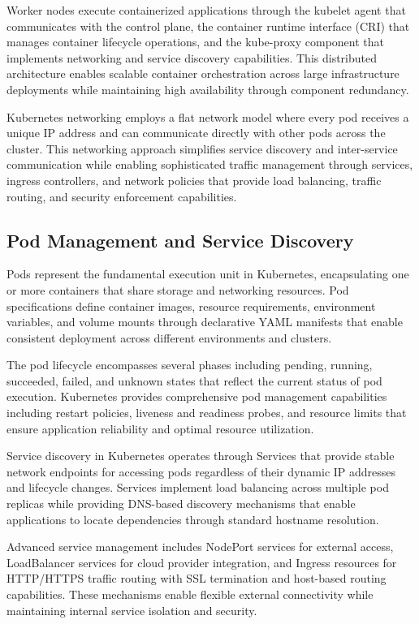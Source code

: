Worker nodes execute containerized applications through the kubelet agent that communicates with the control plane, the container runtime interface (CRI) that manages container lifecycle operations, and the kube-proxy component that implements networking and service discovery capabilities. This distributed architecture enables scalable container orchestration across large infrastructure deployments while maintaining high availability through component redundancy.

Kubernetes networking employs a flat network model where every pod receives a unique IP address and can communicate directly with other pods across the cluster. This networking approach simplifies service discovery and inter-service communication while enabling sophisticated traffic management through services, ingress controllers, and network policies that provide load balancing, traffic routing, and security enforcement capabilities.

\subsection{Pod Management and Service Discovery}

Pods represent the fundamental execution unit in Kubernetes, encapsulating one or more containers that share storage and networking resources. Pod specifications define container images, resource requirements, environment variables, and volume mounts through declarative YAML manifests that enable consistent deployment across different environments and clusters.

The pod lifecycle encompasses several phases including pending, running, succeeded, failed, and unknown states that reflect the current status of pod execution. Kubernetes provides comprehensive pod management capabilities including restart policies, liveness and readiness probes, and resource limits that ensure application reliability and optimal resource utilization.

Service discovery in Kubernetes operates through Services that provide stable network endpoints for accessing pods regardless of their dynamic IP addresses and lifecycle changes. Services implement load balancing across multiple pod replicas while providing DNS-based discovery mechanisms that enable applications to locate dependencies through standard hostname resolution.

Advanced service management includes NodePort services for external access, LoadBalancer services for cloud provider integration, and Ingress resources for HTTP/HTTPS traffic routing with SSL termination and host-based routing capabilities. These mechanisms enable flexible external connectivity while maintaining internal service isolation and security.

